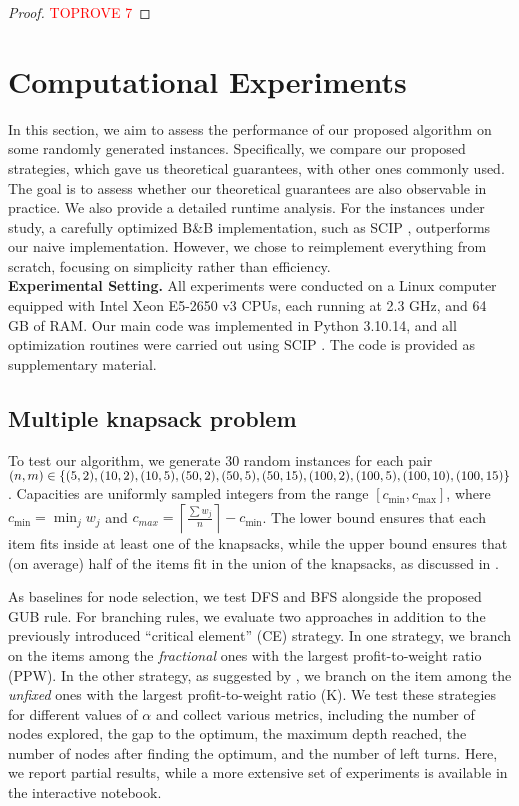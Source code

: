 \documentclass[a4paper,UKenglish,cleveref, autoref, thm-restate, pdfa]{lipics-v2021}
\theoremstyle{plain}
\begin{document}
\begin{proof}\textcolor{red}{TOPROVE 7}\end{proof} 
\section{Computational Experiments}\label{sec:comp_exp}

In this section, we aim to assess the performance of our proposed algorithm on some randomly generated instances. Specifically, we compare our proposed strategies, which gave us theoretical guarantees, with other ones commonly used. The goal is to assess whether our theoretical guarantees are also observable in practice. We also provide a detailed runtime analysis. For the instances under study, a carefully optimized B\&B implementation, such as SCIP \cite{scip}, outperforms our naive implementation. However, we chose to reimplement everything from scratch, focusing on simplicity rather than efficiency. \\

\textbf{Experimental Setting.} All experiments were conducted on a Linux computer equipped with Intel Xeon E5-2650 v3 CPUs, each running at 2.3 GHz, and 64 GB of RAM. Our main code was implemented in Python 3.10.14, and all optimization routines were carried out using SCIP \cite{scip}. The code is provided as supplementary material.

\subsection{Multiple knapsack problem}

To test our algorithm, we generate 30 random instances for each pair $(n, m) \in \{(5, 2), (10, 2), \\(10, 5), (50, 2), (50, 5), (50, 15), (100, 2), (100, 5), (100, 10), (100, 15)\}$. Capacities are uniformly sampled integers from the range $[c_{\min}, c_{\max}]$, where $c_{\min} = \min_{j}{w_j}$ and $c_{max} = \left\lceil \frac{\sum w_j}{n} \right\rceil - c_{\min}$. The lower bound ensures that each item fits inside at least one of the knapsacks, while the upper bound ensures that (on average) half of the items fit in the union of the knapsacks, as discussed in \cite{chvatal}.

As baselines for node selection, we test DFS and BFS alongside the proposed GUB rule. For branching rules, we evaluate two approaches in addition to the previously introduced ``critical element'' (CE) strategy. In one strategy, we branch on the items among the \emph{fractional} ones with the largest profit-to-weight ratio (PPW). In the other strategy, as suggested by \cite{kolesar}, we branch on the item among the \emph{unfixed} ones with the largest profit-to-weight ratio (K).
We test these strategies for different values of $\alpha$ and collect various metrics, including the number of nodes explored, the gap to the optimum, the maximum depth reached, the number of nodes after finding the optimum, and the number of left turns.
Here, we report partial results, while a more extensive set of experiments is available in the interactive notebook. 
\end{document}
